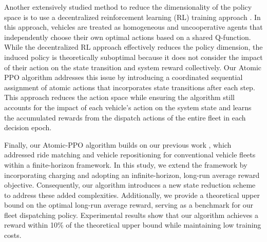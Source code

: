 Another extensively studied method to reduce the dimensionality of the policy space is to use a decentralized reinforcement learning (RL) training approach \citep{xu2018large, wang2018deep, tang2019deep, qin2020ride, han2016routing, jin2019coride, li2019efficient, zhou2019multi, enders2023hybrid, cordeiro2023deep, xi2022hmdrl, chen2024rebalance, xi2021ddrl, ahadi2023cooperative, rong2016rich, yu2019integrated, shou2020optimal, zhou2018optimizing, woywood2024multi, verma2017augmenting, han2016routing, gao2018optimize, wen2017rebalancing, holler2019deep, jiao2021real, garg2018route, singh2021distributed, xu2023multi, wang2024reinforcement, liu2022smart, ma2023prolific, zhu2023dynamic, al2020approximate, wang2022multi}. In this approach, vehicles are treated as homogeneous and uncooperative agents that independently choose their own optimal actions based on a shared Q-function. While the decentralized RL approach effectively reduces the policy dimension, the induced policy is theoretically suboptimal because it does not consider the impact of their action on the state transition and system reward collectively. 
Our Atomic PPO algorithm addresses this issue by introducing a coordinated sequential assignment of atomic actions that incorporates state transitions after each step. This approach reduces the action space while ensuring the algorithm still accounts for the impact of each vehicle's action on the system state and learns the accumulated rewards from the dispatch actions of the entire fleet in each decision epoch.




Finally, our Atomic-PPO algorithm builds on our previous work \citep{feng2021scalable}, which addressed ride matching and vehicle repositioning for conventional vehicle fleets within a finite-horizon framework. In this study, we extend the framework by incorporating charging and adopting an infinite-horizon, long-run average reward objective. Consequently, our algorithm introduces a new state reduction scheme to address these added complexities. Additionally, we provide a theoretical upper bound on the optimal long-run average reward, serving as a benchmark for our fleet dispatching policy. Experimental results show that our algorithm achieves a reward within 10\% of the theoretical upper bound while maintaining low training costs.




